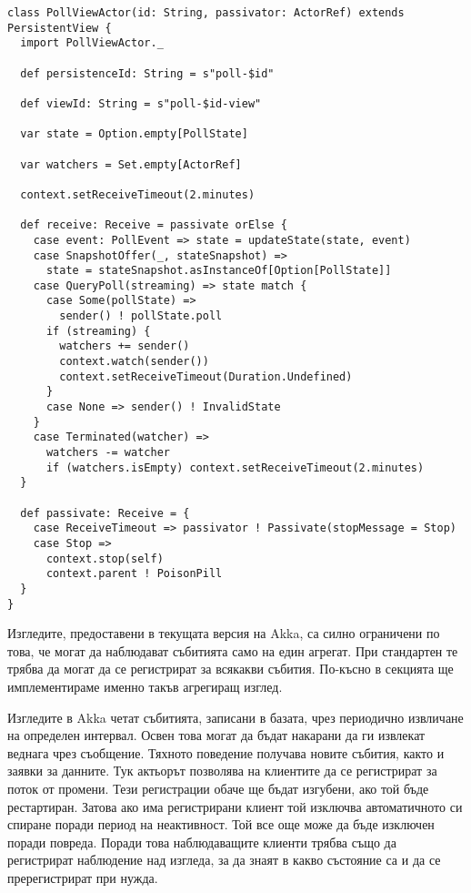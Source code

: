 \begin{lstlisting}[style=listing, caption={Изглед на анкета}]
class PollViewActor(id: String, passivator: ActorRef) extends PersistentView {
  import PollViewActor._
  
  def persistenceId: String = s"poll-$id"
  
  def viewId: String = s"poll-$id-view"
  
  var state = Option.empty[PollState]
  
  var watchers = Set.empty[ActorRef]
  
  context.setReceiveTimeout(2.minutes)
  
  def receive: Receive = passivate orElse {
    case event: PollEvent => state = updateState(state, event)
    case SnapshotOffer(_, stateSnapshot) =>
      state = stateSnapshot.asInstanceOf[Option[PollState]]
    case QueryPoll(streaming) => state match {
      case Some(pollState) =>
        sender() ! pollState.poll
      if (streaming) {
        watchers += sender()
        context.watch(sender())
        context.setReceiveTimeout(Duration.Undefined)
      }
      case None => sender() ! InvalidState
    }
    case Terminated(watcher) =>
      watchers -= watcher
      if (watchers.isEmpty) context.setReceiveTimeout(2.minutes)
  }
  
  def passivate: Receive = {
    case ReceiveTimeout => passivator ! Passivate(stopMessage = Stop)
    case Stop =>
      context.stop(self)
      context.parent ! PoisonPill
  }
}
\end{lstlisting}

Изгледите, предоставени в текущата версия на Akka, са силно ограничени по това, че могат да наблюдават събитията само на един агрегат. При стандартен  те трябва да могат да се регистрират за всякакви събития. По-късно в секцията ще имплементираме именно такъв агрегиращ изглед.

Изгледите в Akka четат събитията, записани в базата, чрез периодично извличане на определен интервал. Освен това могат да бъдат накарани да ги извлекат веднага чрез  съобщение. Тяхното  поведение получава новите събития, както и заявки за данните. Тук актьорът позволява на клиентите да се регистрират за поток от промени. Тези регистрации обаче ще бъдат изгубени, ако той бъде рестартиран. Затова ако има регистрирани клиент той изключва автоматичното си спиране поради период на неактивност. Той все още може да бъде изключен поради повреда. Поради това наблюдаващите клиенти трябва също да регистрират  наблюдение над изгледа, за да знаят в какво състояние са и да се пререгистрират при нужда.

